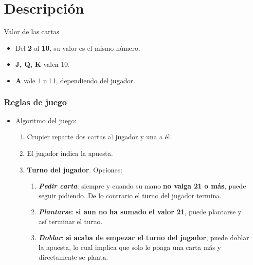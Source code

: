 \section{Descripción} 




\begin{frame}{Valor de las cartas}
    \begin{itemize}
        \item Del \textbf{2} al \textbf{10}, su valor es el mismo número.
        \item \textbf{J, Q, K} valen 10.
        \item \textbf{A} vale 1 u 11, dependiendo del jugador.
    \end{itemize}
\end{frame}


\begin{frame}
	\frametitle{Reglas de juego}
     \begin{itemize}
         
         \item Algoritmo del juego:
         \begin{enumerate}
            \item Crupier reparte dos cartas al jugador y una a él.
            \item El jugador indica la apuesta.
            \item \textbf{Turno del jugador}. Opciones:
            \begin{enumerate}
                \item \textit{\textbf{Pedir carta}}: siempre y cuando su mano \textbf{no valga 21 o más}, puede seguir pidiendo. De lo contrario el turno del jugador termina.
                \item \textit{\textbf{Plantarse}}: \textbf{si aun no ha sumado el valor 21}, puede plantarse y así terminar el turno.
                \item \textit{\textbf{Doblar}}: \textbf{si acaba de empezar el turno del jugador}, puede doblar la apuesta, lo cual implica que solo le ponga una carta más y directamente se planta.
            \end{enumerate}
        \end{enumerate}
     \end{itemize}
    
	
\end{frame}

